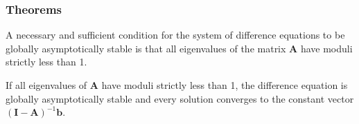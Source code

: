 \documentclass[10pt,usenames,dvipsnames]{beamer}
\theoremstyle{definition}
\begin{document}
\begin{frame}[fragile]
\frametitle{Theorems}
\begin{theorem}
	A necessary and sufficient condition for the system of difference equations to be globally asymptotically stable is that all eigenvalues of the matrix $\mathbf{A}$ have moduli strictly less than 1.
\end{theorem}

\begin{theorem}
	If all eigenvalues of $\mathbf{A}$ have moduli strictly less than 1, the difference equation is globally asymptotically stable and every solution converges to the constant vector $\mathbf{(I - A)}^{-1}\mathbf{b}$.
\end{theorem}
\end{frame}
\end{document}
